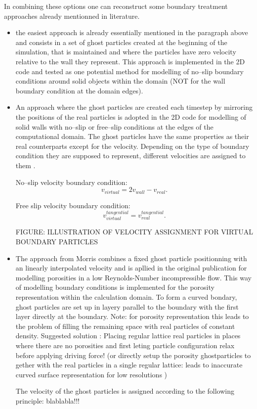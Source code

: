 \documentclass{report}
\begin{document}
In combining these options one can reconstruct some boundary treatment approaches already mentionned in literature.
\begin{itemize}
\item the easiest approach is already essentially mentioned in the paragraph above and consists in a set of ghost particles created at the beginning of the simulation, that is maintained and where the particles have zero velocity relative to the wall they represent. This approach is implemented in the 2D code and tested as one potential method for modelling of no--slip boundary conditions around solid objects within the domain (NOT for the wall boundary condition at the domain edges).

 \item An approach where the ghost particles are created each timestep by mirroring the positions of the real particles is adopted in the 2D code for modelling of solid walls with no--slip or free--slip conditions at the edges of the computational domain.
The ghost particles have the same properties as their real counterparts
except for the velocity. Depending on the type of boundary condition they are
supposed to represent, different velocities are assigned to them \cite{Hu2006}.

No--slip velocity boundary condition:
\begin{equation}
v_{virtual}=2v_{wall}-v_{real}.
\end{equation}

Free slip velocity boundary condition:
\begin{equation}
v_{virtual}^{tangential}=v_{real}^{tangential}.
\end{equation}

FIGURE: ILLUSTRATION OF VELOCITY ASSIGNMENT FOR VIRTUAL BOUNDARY PARTICLES

\item The approach from Morris \cite{Morris1999} combines a fixed ghost particle positionning with an linearly interpolated velocity and is apllied in the original publication for modelling porosities in a low Reynolds-Number incompressible flow.
This way of modelling boundary conditions is implemented for the porosity representation within the calculation domain. 
To form a curved bondary, ghost particles are set up in layery parallel to the boundary with the first layer directly at the boundary. 
Note: for porosity representation this leads to the problem of filling the remaining space with real particles of constant density. Suggested solution \cite{Morris1997}: Placing regular lattice real particles in places where there are no porosities and first leting particle configuration relax before applying driving force! (or directly setup the porosity ghostparticles to gether with the real particles in a single regular lattice: leads to inaccurate curved surface representation for low resolutions \cite{Monaghan1997})

The velocity of the ghost particles is assigned according to the following principle:
blablabla!!!



\end{itemize}
\end{document}
